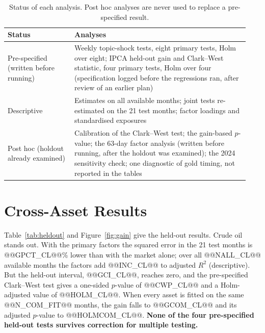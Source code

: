 \documentclass[11pt]{article}
\begin{document}
\begin{table}[t]
\centering\small
\begin{tabular}{@{}p{0.26\linewidth}p{0.68\linewidth}@{}}
\toprule
Status & Analyses \\
\midrule
Pre-specified (written before running) & Weekly topic-shock tests, eight primary tests, Holm over eight; IPCA held-out gain and Clark--West statistic, four primary tests, Holm over four (specification logged before the regressions ran, after review of an earlier plan) \\
\midrule
Descriptive & Estimates on all available months; joint tests re-estimated on the 21 test months; factor loadings and standardised exposures \\
\midrule
Post hoc (holdout already examined) & Calibration of the Clark--West test; the gain-based $p$-value; the 63-day factor analysis (written before running, after the holdout was examined); the 2024 sensitivity check; one diagnostic of gold timing, not reported in the tables \\
\bottomrule
\end{tabular}
\caption{Status of each analysis. Post hoc analyses are never used to replace a pre-specified result.}
\label{tab:status}
\end{table}

\section{Cross-Asset Results}
\label{sec:results}

Table~\ref{tab:heldout} and Figure~\ref{fig:gain} give the held-out results. Crude oil stands out. With the primary factors the squared error in the 21 test months is @@GPCT_CL@@\% lower than with the market alone; over all @@NALL_CL@@ available months the factors add @@INC_CL@@ to adjusted $R^2$ (descriptive). But the held-out interval, @@GCI_CL@@, reaches zero, and the pre-specified Clark--West test gives a one-sided $p$-value of @@CWP_CL@@ and a Holm-adjusted value of @@HOLM_CL@@. When every asset is fitted on the same @@N_COM_FIT@@ months, the gain falls to @@GCOM_CL@@ and its adjusted $p$-value to @@HOLMCOM_CL@@. \textbf{None of the four pre-specified held-out tests survives correction for multiple testing.}
\end{document}
